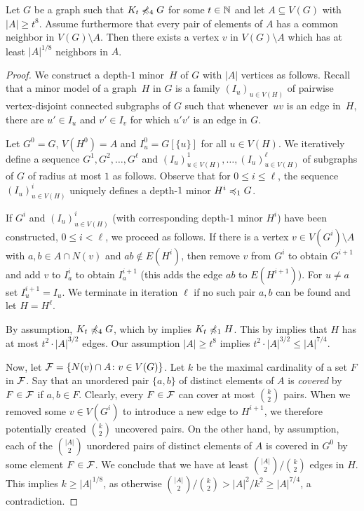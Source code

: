 \begin{lemma}\label{lem:diversity}
  Let $G$ be a graph such that $K_t\not\minor_4G$ for some
  $t\in\N$ and let $A\subseteq V(G)$ with $|A|\geq t^{8}$. 
  Assume furthermore that every pair of elements of $A$ has a common neighbor in $V(G)\setminus A$.
  Then there exists a vertex $v$ in $V(G)\setminus A$ which has at least $|A|^{1/8}$ neighbors in $A$.
\end{lemma}
\begin{proof}
We construct a depth-$1$ 
minor~$H$ of $G$ with $|A|$ vertices as follows. Recall that a 
minor model of a graph~$H$ in $G$ is a family $(I_u)_{u\in V(H)}$ of pairwise vertex-disjoint connected subgraphs of $G$
such that whenever~$uv$ is an edge in~$H$, there 
are $u'\in I_u$ and $v'\in I_v$ for which $u'v'$ 
is an edge in $G$. 

Let $G^0=G$, $V(H^0)=A$ and $I_u^0=G[\{u\}]$ for 
all $u\in V(H)$. We iteratively define a sequence 
$G^1,G^2,\ldots,G^\ell$ and $(I_u)^1_{u\in V(H)},
\ldots, (I_u)^\ell_{u\in V(H)}$ of subgraphs of $G$ 
of radius at most $1$ 
as follows. Observe
that for $0\leq i\leq \ell$, the sequence $(I_u)^i_{u\in V(H)}$
uniquely defines a depth-$1$ minor $H^i\minor_1G$. 

If $G^i$ and $(I_u)^i_{u\in V(H)}$ (with corresponding
depth-$1$ minor $H^i$) have been 
constructed, $0\leq i<\ell$, we proceed as follows. 
If there is a vertex $v\in V(G^i)\setminus A$ with 
$a,b\in A \cap N(v)$ and $ab\not\in E(H^i)$, then 
remove $v$ from $G^i$ to obtain $G^{i+1}$ 
and add $v$ to $I_a^i$ to obtain $I_a^{i+1}$ (this 
adds the edge $ab$ to $E(H^{i+1})$). 
For $u\neq a$ set $I_u^{i+1}=I_u$. We terminate
in iteration $\ell$ if no such pair $a,b$ can be found 
and let $H=H^\ell$. 

By assumption, $K_t\not\minor_4 G$, which by 
 implies $K_t\not\minor_1 H$. 
This by  implies that $H$ has at most
$t^2\cdot|A|^{3/2}$ edges. Our assumption $|A|\geq t^8$
implies $t^2\cdot |A|^{3/2}\leq |A|^{7/4}$. 

Now, let ${\cal F}=\set{N(v)\cap A\colon v\in V(G)}$. 
  Let $k$ be the maximal cardinality of a set $F$ in ${\cal F}$.
  Say that an unordered pair $\{a,b\}$ of distinct elements of $A$ is \emph{covered} by $F\in {\cal F}$
  if  $a,b\in F$. Clearly, every $F\in {\cal F}$ can cover at most $\binom{k}{2}$ pairs. When we removed some $v\in V(G^i)$ to
  introduce a new edge to $H^{i+1}$, we therefore potentially
  created $\binom{k}{2}$ uncovered pairs. On the other hand, 
  by assumption, each of the $\binom{|A|}{2}$ unordered pairs of
   distinct elements of $A$ is covered in $G^0$ by some element 
   $F\in {\cal F}$. We conclude that we have at least 
   $\binom{|A|}{2}/\binom{k}{2}$ edges in $H$. 
   This implies $k\geq |A|^{1/8}$, as otherwise
   $\binom{|A|}{2}/\binom{k}{2}> |A|^2/k^2\geq |A|^{7/4}$,
   a contradiction.
\end{proof}

